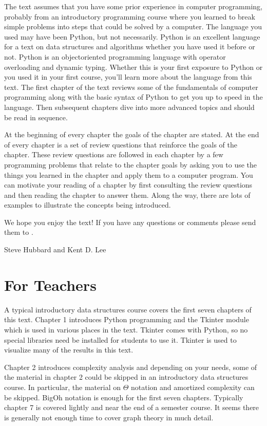 \documentclass[letterpaper,10pt,english]{sphinxmanual}
\begin{document}
The text assumes that you have some prior experience in computer programming, probably from an introductory programming course where you learned to break simple problems into steps that could be solved by a computer. The language you used may have been Python, but not necessarily. Python is an excellent language for a text on data structures and algorithms whether you have used it before or not. Python is an object\sphinxhyphen{}oriented programming language with operator overloading and dynamic typing. Whether this is your first exposure to Python or you used it in your first course, you’ll learn more about the language from this text. The first chapter of the text reviews some of the fundamentals of computer programming along with the basic syntax of Python to get you up to speed in the language. Then subsequent chapters dive into more advanced topics and should be read in sequence.

At the beginning of every chapter the goals of the chapter are stated. At the end of every chapter is a set of review questions that reinforce the goals of the chapter. These review questions are followed in each chapter by a few programming problems that relate to the chapter goals by asking you to use the things you learned in the chapter and apply them to a computer program. You can motivate your reading of a chapter by first consulting the review questions and then reading the chapter to answer them. Along the way, there are lots of examples to illustrate the concepts being introduced.

We hope you enjoy the text! If you have any questions or comments please send them to .

\textendash{} Steve Hubbard and Kent D. Lee

\chapter*{For Teachers}



A typical introductory data structures course covers the first seven chapters of this text. Chapter 1 introduces Python programming and the Tkinter module which is used in various places in the text. Tkinter comes with Python, so no special libraries need be installed for students to use it. Tkinter is used to visualize many of the results in this text.

Chapter 2 introduces complexity analysis and depending on your needs, some of the material in chapter 2 could be skipped in an introductory data structures course. In particular, the material on \(\Theta\) notation and amortized complexity can be skipped. Big\sphinxhyphen{}Oh notation is enough for the first seven chapters. Typically chapter 7 is covered lightly and near the end of a semester course. It seems there is generally not enough time to cover graph theory in much detail.
\end{document}
